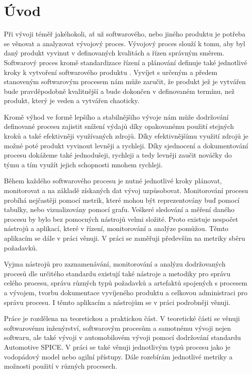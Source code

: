 \documentclass[czech,master,public,dept460,male,cpdeclaration,oneside]{diploma}
\begin{document}
\MakeTitlePages

 
\section{Úvod}
\label{sec:Introduction}

Při vývoji téměř jakéhokoli, ať už softwarového, nebo jiného produktu je potřeba se věnovat a analyzovat vývojový proces. Vývojový proces slouží k tomu, aby byl daný produkt vyvinut v definovaných kvalitách a řízen správným směrem. Softwarový proces kromě standardizace řízení a plánování definuje také jednotlivé kroky k vytvoření softwarového produktu \cite{ref:sommerrville_sw_process}. Vyvíjet s určeným a předem stanoveným softwarovým procesem nám může zaručit, že produkt jež je vytvářen bude pravděpodobně kvalitnější a bude dokončen v definovaném termínu, než produkt, který je veden a vytvářen chaoticky.

Kromě výhod ve formě lepšího a stabilnějšího vývoje nám může dodržování definované procesu zajistit snížení výdajů díky opakovanému použití stejných kroků a také efektivněji využívaných zdrojů. Díky efektivnějšímu využití zdrojů je možné poté produkt vyvinout levněji a rychleji. Díky sjednocení a dokumentování procesu dokážeme také jednodušeji, rychleji a tedy levněji zaučit nováčky do týmu a tím využít jejich schopnosti mnohem rychleji. 

Během každého softwarového procesu je nutné jednotlivé kroky plánovat, monitorovat a na základě získaných dat vývoj uzpůsobovat. Monitorování procesu probíhá nejčastěji pomocí metrik, které mohou být reprezentovány buď pomocí tabulky, nebo vizualizovány pomocí grafu. Veškeré sledování a měření daného procesu by bylo bez pomocných nástrojů velmi složité. Proto existuje nespočet nástrojů a aplikací, které v řízení, monitorování a analýze pomůžou. Těmto aplikacím se dále v práci věnuji. V práci se zaměřuji především na metriky sběru požadavků.

Vyjma nástrojů pro zaznamenávání, monitorování a analýzu dodržovaných procesů dle určitého standardu existují také nástroje a metodiky pro správu celého procesu, správu různých typů požadavků a artefaktů spojených s procesem a vývojem, tvorbu dokumentace vyvíjeného produktu a celkovou administraci pro správu procesu. I těmto aplikacím a nástrojům se v práci podrobněji věnuji.

Práce je rozdělena na teoretickou a praktickou část. V teoretické části se věnuji softwarovému inženýrství, softwarovým procesům a samotnému vývoji nejen softwaru, ale také vývoji v automobilovém vývoji pomocí dodržování standardu Automotive SPICE. V práci se také věnuji jednotlivým typů procesu jako je vodopádový model nebo agilní přístupy. Dále rozebírám jednotlivé metriky a možnosti použití v různých procesech.
\end{document}
